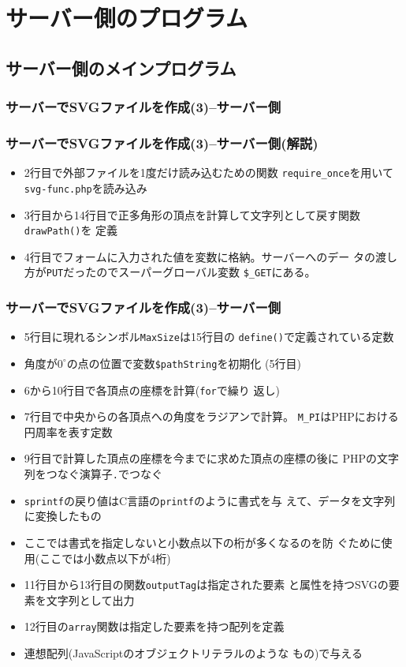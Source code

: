 \section{サーバー側のプログラム}
\subsection{サーバー側のメインプログラム}
\begin{frame}[containsverbatim]
 \frametitle{サーバーでSVGファイルを作成(3)--サーバー側}
\end{frame}
\begin{frame}[containsverbatim]
 \frametitle{サーバーでSVGファイルを作成(3)--サーバー側(解説)}
 \begin{itemize}
	\item 2行目で外部ファイルを1度だけ読み込むための関数
				\Verb+require_once+を用いて\Verb+svg-func.php+を読み込み
	\item 3行目から14行目で正多角形の頂点を計算して文字列として戻す関数\texttt{drawPath()}を
				定義
	\item 4行目でフォームに入力された値を変数に格納。サーバーへのデー
							 タの渡し方が\texttt{PUT}だったのでスーパーグローバル変数
							 \Verb+$_GET+にある。
\end{itemize}
\end{frame}
\begin{frame}[containsverbatim]
 \frametitle{サーバーでSVGファイルを作成(3)--サーバー側}
				\begin{itemize}
				 \item 5行目に現れるシンボル\texttt{MaxSize}は15行目の
							 \texttt{define()}で定義されている定数
				 \item 角度が$0^{\circ}$の点の位置で変数\Verb+$pathString+を初期化
							 (5行目)
				 \item 6から10行目で各頂点の座標を計算(\texttt{for}で繰り
							 返し)
				 \item 7行目で中央からの各頂点への角度をラジアンで計算。
							 \Verb+M_PI+はPHPにおける円周率を表す定数
				 \item 9行目で計算した頂点の座標を今までに求めた頂点の座標の後に
							 PHPの文字列をつなぐ演算子\texttt{.}でつなぐ
				 \item \texttt{sprintf}の戻り値はC言語の\texttt{printf}のように書式を与
							 えて、データを文字列に変換したもの
				 \item ここでは書式を指定しないと小数点以下の桁が多くなるのを防
							 ぐために使用(ここでは小数点以下が4桁)
				 \item 11行目から13行目の関数\texttt{outputTag}は指定された要素
							 と属性を持つSVGの要素を文字列として出力
				 \item 12行目の\texttt{array}関数は指定した要素を持つ配列を定義
				 \item 連想配列(JavaScriptのオブジェクトリテラルのような
               もの)で与える
				\end{itemize}
 \end{frame}

